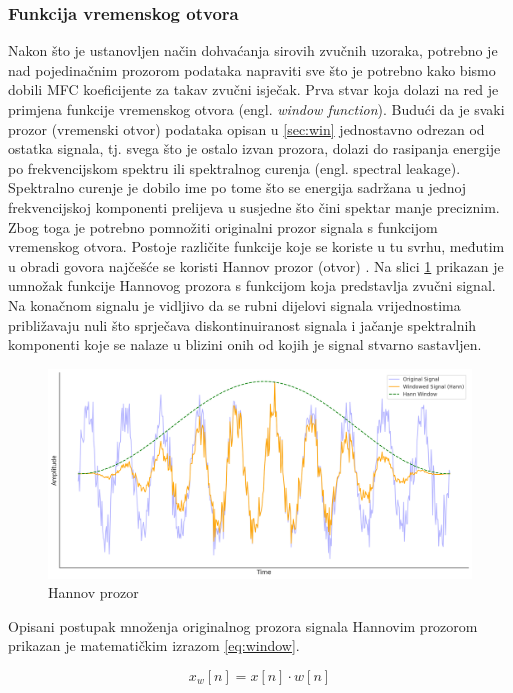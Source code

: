 \subsubsection{Funkcija vremenskog otvora}
Nakon što je ustanovljen način dohvaćanja sirovih zvučnih uzoraka, potrebno je
nad pojedinačnim prozorom podataka napraviti sve što je potrebno kako bismo
dobili MFC koeficijente za takav zvučni isječak. Prva stvar koja dolazi na red 
je primjena funkcije vremenskog otvora (engl. \textit{window function}). Budući da je svaki
prozor (vremenski otvor) podataka opisan u \ref{sec:win} jednostavno odrezan od ostatka
signala, tj. svega što je ostalo izvan prozora, dolazi do rasipanja energije po
frekvencijskom spektru ili spektralnog curenja (engl. spectral leakage). Spektralno curenje
je dobilo ime po tome što se energija sadržana u jednoj frekvencijskoj komponenti prelijeva
u susjedne što čini spektar manje preciznim.
Zbog toga je potrebno pomnožiti originalni prozor signala s funkcijom vremenskog otvora. Postoje
različite funkcije koje se koriste u tu svrhu, međutim u obradi govora najčešće se koristi
Hannov prozor (otvor) \cite{windowing}.
Na slici \ref{pic:hann} prikazan je umnožak funkcije Hannovog prozora s funkcijom
koja predstavlja zvučni signal. Na konačnom signalu je vidljivo da se rubni dijelovi
signala vrijednostima približavaju nuli što sprječava diskontinuiranost signala i jačanje
spektralnih komponenti koje se nalaze u blizini onih od kojih je signal stvarno sastavljen.

\begin{figure}[htb]
    \centering
    \includegraphics[width=0.85\linewidth]{Chapters/struktura_sustava/generiranje_znacajki/hann.png} 
    \caption{Hannov prozor}
    \label{pic:hann}
\end{figure}

Opisani postupak množenja originalnog prozora signala Hannovim prozorom prikazan je 
matematičkim izrazom \ref{eq:window}.

\begin{equation}
    x_w[n] = x[n] \cdot w[n]
    \label{eq:window}
\end{equation}

